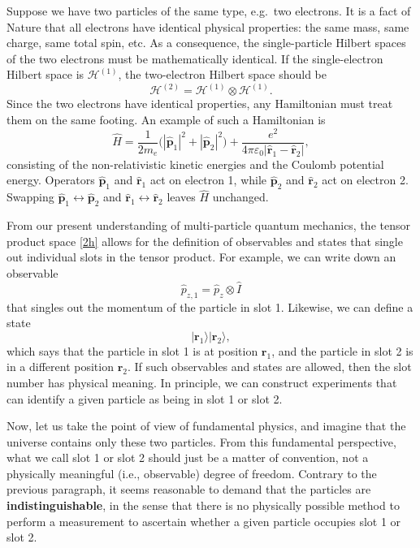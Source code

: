 \documentclass[prx,12pt]{revtex4-2}
\begin{document}
Suppose we have two particles of the same type, e.g.~two electrons.
It is a fact of Nature that all electrons have identical physical
properties: the same mass, same charge, same total spin, etc.  As a
consequence, the single-particle Hilbert spaces of the two electrons
must be mathematically identical.  If the single-electron Hilbert
space is $\mathscr{H}^{(1)}$, the two-electron Hilbert space should be
\begin{equation}
  \mathscr{H}^{(2)} = \mathscr{H}^{(1)} \otimes \mathscr{H}^{(1)}.
  \label{2h}
\end{equation}
Since the two electrons have identical properties, any Hamiltonian
must treat them on the same footing.  An example of such a Hamiltonian
is
\begin{equation}
  \hat{H} = \frac{1}{2m_e} \Big(|\hat{\mathbf{p}}_1|^2 + |\hat{\mathbf{p}}_2|^2\Big) + \frac{e^2}{4\pi\varepsilon_0|\hat{\mathbf{r}}_1 - \hat{\mathbf{r}}_2|},
  \label{exampleH}
\end{equation}
consisting of the non-relativistic kinetic energies and the Coulomb
potential energy.  Operators $\hat{\mathbf{p}}_1$ and
$\hat{\mathbf{r}}_1$ act on electron 1, while $\hat{\mathbf{p}}_2$ and
$\hat{\mathbf{r}}_2$ act on electron 2.  Swapping $\hat{\mathbf{p}}_1
\leftrightarrow \hat{\mathbf{p}}_2$ and $\hat{\mathbf{r}}_1
\leftrightarrow \hat{\mathbf{r}}_2$ leaves $\hat{H}$ unchanged.

From our present understanding of multi-particle quantum mechanics,
the tensor product space \eqref{2h} allows for the definition of
observables and states that single out individual slots in the tensor
product.  For example, we can write down an observable
\begin{equation}
  \hat{p}_{z,1} = \hat{p}_z \otimes \hat{I}
\end{equation}
that singles out the momentum of the particle in slot 1.  Likewise, we
can define a state
\begin{equation}
  |\mathbf{r}_1\rangle |\mathbf{r}_2\rangle,
\end{equation}
which says that the particle in slot 1 is at position $\mathbf{r}_1$,
and the particle in slot 2 is in a different position $\mathbf{r}_2$.
If such observables and states are allowed, then the slot number has
physical meaning.  In principle, we can construct experiments that can
identify a given particle as being in slot 1 or slot 2.

Now, let us take the point of view of fundamental physics, and imagine
that the universe contains only these two particles.  From this
fundamental perspective, what we call slot 1 or slot 2 should just be
a matter of convention, not a physically meaningful (i.e., observable)
degree of freedom.  Contrary to the previous paragraph, it seems
reasonable to demand that the particles are
\textbf{indistinguishable}, in the sense that there is no physically
possible method to perform a measurement to ascertain whether a given
particle occupies slot 1 or slot 2.
\end{document}
